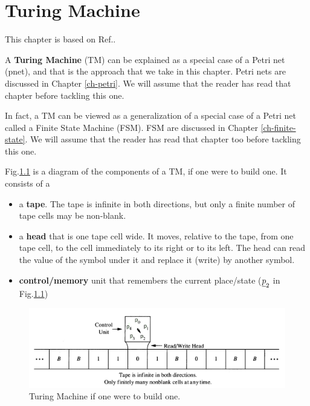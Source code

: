 \chapter{Turing Machine}
\label{ch-turing}

\newcommand{\TA}[0]{\Sigma^+}

This chapter is based on Ref.\cite{wiki-turing-machine}.

A {\bf Turing Machine} (TM)  can be explained as a 
special case of a Petri net (pnet), and that
is the approach that we take in this chapter.
Petri nets are discussed in Chapter \ref{ch-petri}. We will assume
that the reader has read that chapter before tackling this one.

In fact, a TM can be viewed as a generalization
of a special case of a Petri net called a Finite
State Machine (FSM).  FSM are discussed
in Chapter \ref{ch-finite-state}.
We will assume
that the reader has read that chapter too before tackling this one.

Fig.\ref{fig-turing-phsical} is
a diagram of the components
of a TM, if one were to build one.
It consists of a 
\begin{itemize}
\item
a {\bf tape}. The tape is infinite in both directions,
but only a finite number of tape cells may be non-blank.
\item
a {\bf head}
that is one tape cell wide. It moves, relative to the tape,  from one tape cell, 
to the cell immediately to its right or to its left.
The head can read the value of the symbol under it and replace
it (write) by another symbol.
\item {\bf control/memory} unit that remembers 
the current place/state ($\rvp_2$ in Fig.\ref{fig-turing-phsical})
\end{itemize}

\begin{figure}[h!]
\centering
\includegraphics[width=6in]
{turing/turing-physical.jpg}
\caption{Turing Machine if one were to build one.}
\label{fig-turing-phsical}
\end{figure}

